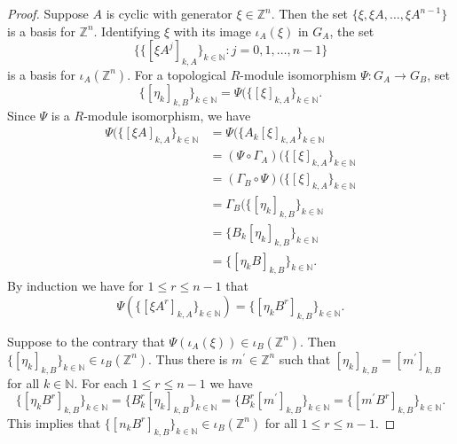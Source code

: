 \documentclass{amsart}
\theoremstyle{plain}
\theoremstyle{definition}
\theoremstyle{remark}
\begin{document}
\begin{proof} Suppose $A$ is cyclic with generator $\xi\in{\mathbb Z}^n$. Then the set $\{\xi,\xi A,\dots,\xi A^{n-1}\}$ is a basis for ${\mathbb Z}^n$. Identifying $\xi$ with its image $\iota_A(\xi)$ in $G_A$, the set
\[ \big\{ \{ [\xi A^j]_{k,A}\}_{k\in {\mathbb N}}: j=0,1,\dots,n-1\big\}\]
is a basis for $\iota_A({\mathbb Z}^n)$. For a topological $R$-module isomorphism $\Psi:G_A\to G_B$,
set
\[ \{ [\eta_k]_{k,B}\}_{k\in{\mathbb N}} = \Psi( \{ [\xi]_{k,A}\}_{k\in{\mathbb N}}.\]
Since $\Psi$ is a $R$-module isomorphism, we have
\begin{align*}
\Psi( \{ [\xi A]_{k,A}\}_{k\in{\mathbb N}}
& = \Psi ( \{ A_k[\xi]_{k,A}\}_{k\in{\mathbb N}} \\
& = (\Psi\circ \Gamma_A)(\{ [\xi]_{k,A}\}_{k\in{\mathbb N}} \\
& = (\Gamma_B\circ \Psi) (\{ [\xi]_{k,A}\}_{k\in{\mathbb N}} \\
& = \Gamma_B ( \{ [\eta_k]_{k,B}\}_{k\in{\mathbb N}} \\
& = \{ B_k[\eta_k]_{k,B}\}_{k\in{\mathbb N}} \\
& = \{ [\eta_k B]_{k,B}\}_{k\in{\mathbb N}}.
\end{align*}
By induction we have for $1\leq r\leq n-1$ that
\[ \Psi(\{ [\xi A^r]_{k,A}\}_{k\in {\mathbb N}}) = \{ [\eta_k B^r]_{k,B}\}_{k\in{\mathbb N}}.\]

Suppose to the contrary that $\Psi(\iota_A(\xi))\in \iota_B({\mathbb Z}^n)$. Then $\{ [\eta_k]_{k,B}\}_{k\in{\mathbb N}}\in \iota_B({\mathbb Z}^n)$. Thus there is $m^\prime\in {\mathbb Z}^n$ such that $[\eta_k]_{k,B} = [m^\prime]_{k,B}$ for all $k\in{\mathbb N}$. For each $1\leq r\leq n-1$ we have
\[ \{ [\eta_k B^r]_{k,B}\}_{k\in{\mathbb N}} = \{ B_k^r[\eta_k]_{k,B}\}_{k\in{\mathbb N}} = 
\{ B_k^r[m^\prime]_{k,B}\}_{k\in{\mathbb N}} = \{ [m^\prime B^r]_{k,B}\}_{k\in{\mathbb N}}.
\]
This implies that $\{ [n_k B^r]_{k,B}\}_{k\in{\mathbb N}}\in \iota_B({\mathbb Z}^n)$ for all $1\leq r\leq n-1$.


\end{proof}
\end{document}
